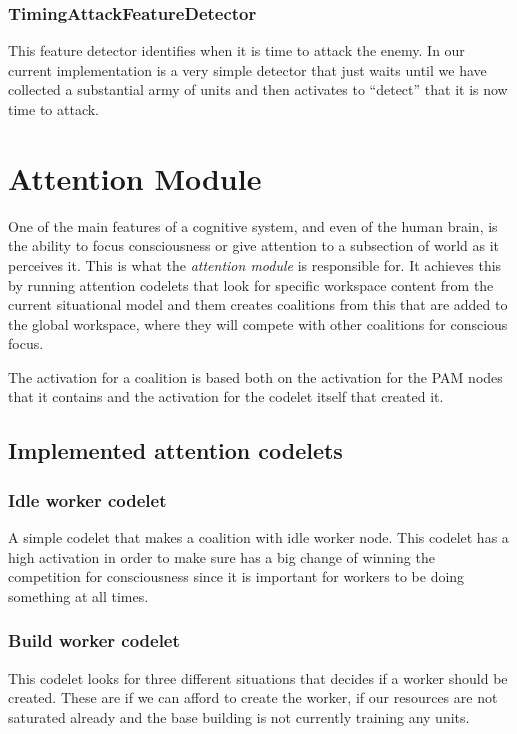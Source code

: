 \subsubsection{TimingAttackFeatureDetector}
This feature detector identifies when it is time to attack the enemy. In our current implementation is a very simple detector that just waits until we have collected a substantial army of units and then activates to ``detect'' that it is now time to attack.

\section{Attention Module}
\label{sec:attention}
One of the main features of a cognitive system, and even of the human brain, is the ability to focus consciousness or give attention to a subsection of world as it perceives it. This is what the {\em attention module} is responsible for. It achieves this by running attention codelets that look for specific workspace content from the current situational model and them creates coalitions from this that are added to the global workspace, where they will compete with other coalitions for conscious focus.

The activation for a coalition is based both on the activation for the PAM nodes that it contains and the activation for the codelet itself that created it.

\subsection{Implemented attention codelets}
\subsubsection{Idle worker codelet}
A simple codelet that makes a coalition with idle worker node. This codelet has a high activation in order to make sure has a big change of winning the competition for consciousness since it is important for workers to be doing something at all times.

\subsubsection{Build worker codelet}
This codelet looks for three different situations that decides if a worker should be created. These are if we can afford to create the worker, if our resources are not saturated already and the base building is not currently training any units.

